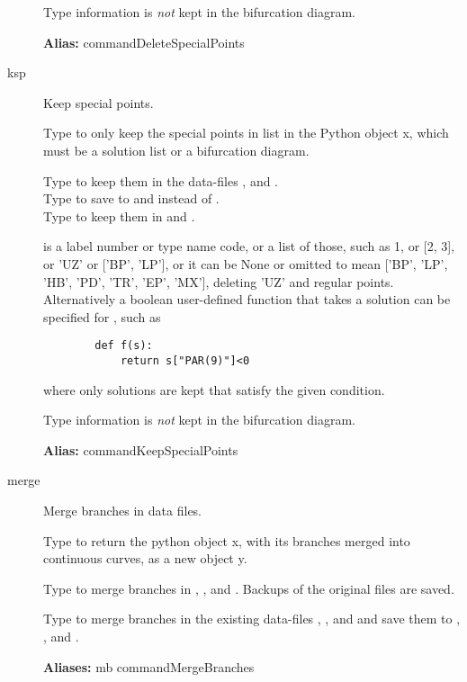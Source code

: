 \documentclass[12pt]{report}
\begin{document}
\begin{description}
    Type information is \emph{not} kept in the bifurcation diagram.

\textbf{Alias:} commandDeleteSpecialPoints

\item[ksp]
Keep special points.

    Type  to only keep the special points in list in
    the Python object x, which must be a solution list or a bifurcation diagram.

    Type  to keep them in the data-files
    , and .\\
    Type  to save to  and
     instead of .\\
    Type  to keep them in  and .

     is a label number or type name code, or a list of those,
    such as 1, or [2, 3], or 'UZ' or ['BP', 'LP'], or it can be None or
    omitted to mean ['BP', 'LP', 'HB', 'PD', 'TR', 'EP', 'MX'], deleting 'UZ' and
    regular points.\\
    Alternatively a boolean user-defined function  that
    takes a solution can be specified for , such as
\begin{verbatim}
        def f(s):
            return s["PAR(9)"]<0
\end{verbatim}
    where only solutions are kept that satisfy the given condition.

    Type information is \emph{not} kept in the bifurcation diagram.

\textbf{Alias:} commandKeepSpecialPoints

\item[merge]
Merge branches in data files.

    Type  to return the python object x, with its branches
    merged into continuous curves, as a new object y.

    Type  to merge branches in ,
    , and .  Backups of the
    original files are saved.

    Type  to merge branches in the existing data-files
    , , and  and save them to 
    , , and .

\textbf{Aliases:} mb commandMergeBranches


\end{description}
\end{document}
